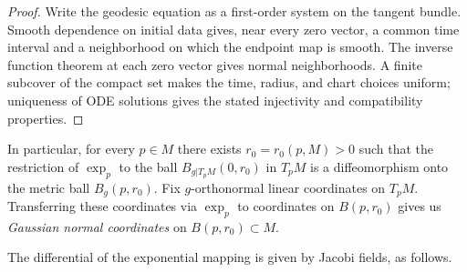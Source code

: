 \begin{proof}
\sketch
{}
Write the geodesic equation as a first-order system on the tangent bundle. Smooth dependence on initial data gives, near every zero vector, a common time interval and a neighborhood on which the endpoint map is smooth. The inverse function theorem at each zero vector gives normal neighborhoods. A finite subcover of the compact set makes the time, radius, and chart choices uniform; uniqueness of ODE solutions gives the stated injectivity and compatibility properties.
\end{proof}

In particular, for every $p\in M$ there exists
$r_0=r_{0}(p,M)>0$ such that the restriction of $\exp_p$ to the
ball $B_{g|T_pM}(0,r_0)$ in $T_pM$ is a diffeomorphism onto the
metric ball $B_g(p,r_0)$. Fix $g$-orthonormal linear coordinates
on $T_pM$. Transferring these coordinates via $\exp_p$ to
coordinates on $B(p,r_0)$ gives us {\sl Gaussian normal
coordinates} on $B(p,r_0)\subset M$.

The differential of the exponential mapping is given by Jacobi
fields, as follows.

